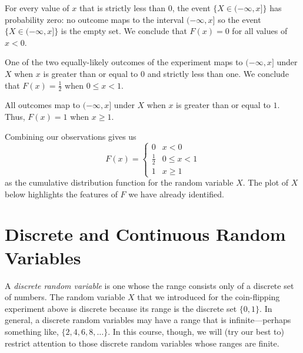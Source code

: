 \documentclass[../book.tex]{subfiles}
\begin{document}
\begin{solution}
For every value of \(x\) that is strictly less than \(0\), the event \(\{ X \in (-\infty, x]\}\) has probability zero: no outcome maps to the interval \((-\infty, x]\) so the event \(\{ X \in (-\infty, x]\}\) is the empty set. We conclude that \(F(x)  = 0\) for all values of \(x < 0\).

One of the two equally-likely outcomes of the experiment maps to \((-\infty, x]\) under \(X\) when \(x\) is greater than or equal to \(0\) and strictly less than one.  We conclude that \(F(x) = \frac{1}{2}\) when \(0 \leq x < 1\).

All outcomes map to \((-\infty, x]\) under \(X\) when \(x\) is greater than or equal to \(1\). Thus, \(F(x) = 1\) when \(x \geq 1\).

Combining our observations gives us
\begin{equation}\label{eq:rv-4}
F(x) 
= 
\begin{cases}
0 & x<0 \\
\frac{1}{2} & 0 \leq x < 1 \\
1 & x \geq 1
\end{cases} 
\end{equation}
as the cumulative distribution function for the random variable \(X\). The plot of \(X\) below highlights the features of \(F\) we have already identified.

\begin{center}\end{center}
\end{solution}

\section{Discrete and Continuous Random Variables}

A \emph{discrete random variable} is one whose the range consists only of a discrete set of numbers. The random variable \(X\) that we introduced for the coin-flipping experiment above is discrete because its range is the discrete set \(\{ 0, 1\}\).  In general, a discrete random variables may have a range that is infinite---perhaps something like, \(\{ 2, 4, 6, 8, \ldots \}\). In this course, though, we will (try our best to) restrict attention to those discrete random variables whose ranges are finite.
\end{document}
